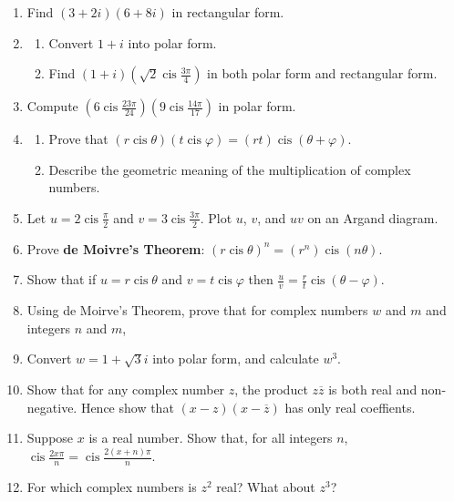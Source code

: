 \documentclass[a4paper,10pt,titlepage]{article}
\theoremstyle{definition}
\DeclareMathOperator{\cis}{cis}
\begin{document}
\begin{enumerate}[resume]
  \item Find $ (3 + 2i)(6 + 8i) $ in rectangular form.
  \item \begin{enumerate}
          \item Convert $ 1 + i $ into polar form.
          \item Find $ (1 + i)(\sqrt{2} \cis \frac{3\pi}{4}) $ in both polar form and rectangular form.
        \end{enumerate}
  \item Compute $ (6 \cis \frac{23\pi}{24})(9\cis \frac{14\pi}{17}) $ in polar form.
  \item \begin{enumerate}
          \item Prove that $ (r \cis \theta)(t \cis \varphi) = (rt) \cis (\theta + \varphi) $.
          \item Describe the geometric meaning of the multiplication of complex numbers.
        \end{enumerate}
  \item Let $ u = 2 \cis \frac{\pi}{2} $ and $ v = 3 \cis \frac{3\pi}{2} $. Plot $ u $, $ v $, and $ uv $ on an Argand diagram.
  \item Prove \textbf{de Moivre's Theorem}: $ (r \cis \theta)^n = (r^n) \cis (n\theta) $.
  \item Show that if $ u = r \cis \theta $ and $ v = t \cis \varphi $ then $ \frac{u}{v} = \frac{r}{t}\cis(\theta - \varphi) $.
  \item Using de Moirve's Theorem, prove that for complex numbers $ w $ and $ m $ and integers $ n $ and $ m $,
  \item Convert $ w = 1 + \sqrt{3}i $ into polar form, and calculate $ w^3 $.
  \item Show that for any complex number $ z $, the product $ z \overline z $ is both real and non-negative.
        Hence show that $ (x - z)(x - \overline z) $ has only real coeffients.
  \item Suppose $ x $ is a real number. Show that, for all integers $ n $, $ \cis \frac{2x\pi}{n} = \cis \frac{2(x + n)\pi}{n} $.
  \item For which complex numbers is $ z^2 $ real? What about $ z^3 $?

\end{enumerate}
\end{document}
